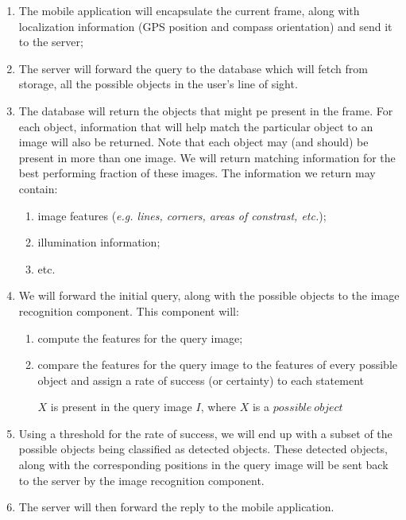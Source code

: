 \documentclass[a4paper,onecolumn,oneside,titlepage,11pt]{article}
\begin{document}
\begin{enumerate}
	\item The mobile application will encapsulate the current frame, along with localization information (GPS position and compass orientation) and send it to the server;
	\item The server will forward the query to the database which will fetch from storage, all the possible objects in the user's line of sight.
	\item The database will return the objects that might pe present in the frame. For each object, information that will help match the particular object to an image will also be returned. Note that each object may (and should) be present in more than one image. We will return matching information for the best performing fraction of these images. The information we return may contain:
	\begin{enumerate}
		\item image features (\emph{e.g. lines, corners, areas of constrast, etc.});
		\item illumination information;
		\item etc.
	\end{enumerate}
	\item We will forward the initial query, along with the possible objects to the image recognition component. This component will:
		\begin{enumerate}
			\item compute the features for the query image;
			\item compare the features for the query image to the features of every possible object and assign a rate of success (or certainty) to each statement
			
			$X$ is present in the query image $I$, where $X$ is a $possible\:object$
		\end{enumerate}
		\item Using a threshold for the rate of success, we will end up with a subset of the possible objects being classified as detected objects. These detected objects, along with the corresponding positions in the query image will be sent back to the server by the image recognition component.
		\item The server will then forward the reply to the mobile application.
\end{enumerate}
\end{document}
